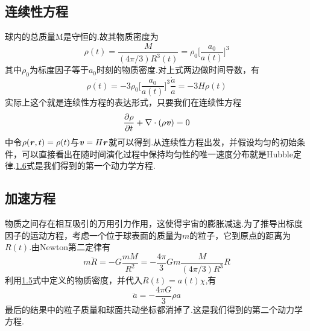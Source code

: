 \documentclass[a4paper]{book}
\newcommand{\xtjc}[1]{\textbf{\textit{#1}}}
\begin{document}
\subsection{连续性方程}
球内的总质量M是守恒的.故其物质密度为
\begin{equation}
	\rho(t)=\frac{M}{(4\pi/3)R^3(t)}=\rho_{0}\Big[\frac{a_0}{a(t)}\Big]^3
\end{equation}
其中$\rho_{0}$为标度因子等于$a_0$时刻的物质密度.对上式两边做时间导数，有
\begin{equation}\label{1.6}
	\dot{\rho(t)}=-3\rho_{0}\Big[\frac{a_0}{a(t)}\Big]^3\frac{\dot{a}}{a}=-3H\rho(t)
\end{equation}
实际上这个就是连续性方程的表达形式，只要我们在连续性方程
\begin{equation}
	\frac{\partial\rho}{\partial t}+\nabla\cdot(\rho\xtjc{v})=0
\end{equation}
中令$\rho(\xtjc{r},t)=\rho(t)$与$\xtjc{v}=H\xtjc{r}$就可以得到.从连续性方程出发，并假设均匀的初始条件，可以直接看出在随时间演化过程中保持均匀性的唯一速度分布就是Hubble定律.\hyperref[1.6]{1.6}式是我们得到的第一个动力学方程.\par 
\subsection{加速方程}
物质之间存在相互吸引的万用引力作用，这使得宇宙的膨胀减速.为了推导出标度因子的运动方程，考虑一个位于球表面的质量为$m$的粒子，它到原点的距离为$R(t)$.由Newton第二定律有
\begin{equation}
	m\ddot{R}=-G\frac{mM}{R^2}=-\frac{4\pi}{3}Gm\frac{M}{(4\pi/3)R^3}R
\end{equation}
利用\hyperref[1.5]{1.5}式中定义的物质密度，并代入$R(t)=a(t)\chi$,有
\begin{equation}\label{1.9}
	\ddot{a}=-\frac{4\pi G}{3}\rho a
\end{equation}
最后的结果中的粒子质量和球面共动坐标都消掉了.这是我们得到的第二个动力学方程.
\end{document}

